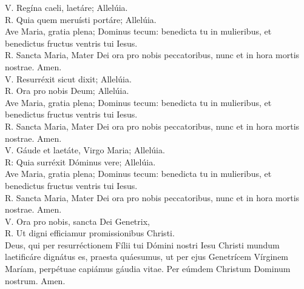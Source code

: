 \documentclass[letterpaper, landscape, 10pt, twocolumn]{article}
\begin{document}
  \noindent
  \normalsize
  {\color{red} V. R}egína caeli, laetáre; {\color{red} A}llelúia.\\
  {\color{red} R. Q}uia quem meruísti portáre; {\color{red} A}llelúia.\\

  \noindent
  {\color{red} A}ve Maria, gratia plena; Dominus tecum: benedicta tu in mulieribus, et benedictus fructus ventris tui Iesus.\\
  {\color{red} R. S}ancta Maria, Mater Dei ora pro nobis peccatoribus, nunc et in hora mortis nostrae. {\color{red} A}men.\\

  \noindent
  {\color{red} V. R}esurréxit sicut dixit; {\color{red} A}llelúia.\\
  {\color{red} R. O}ra pro nobis Deum; {\color{red} A}llelúia.\\

  \noindent
  {\color{red} A}ve Maria, gratia plena; Dominus tecum: benedicta tu in mulieribus, et benedictus fructus ventris tui Iesus.\\
  {\color{red} R. S}ancta Maria, Mater Dei ora pro nobis peccatoribus, nunc et in hora mortis nostrae. {\color{red} A}men.\\

  \noindent
  {\color{red} V. G}áude et laetáte, Virgo Maria; {\color{red} A}llelúia.\\
  {\color{red} R: Q}uia surréxit Dóminus vere; {\color{red} A}llelúia.\\

  \noindent
  {\color{red} A}ve Maria, gratia plena; Dominus tecum: benedicta tu in mulieribus, et benedictus fructus ventris tui Iesus.\\
  {\color{red} R. S}ancta Maria, Mater Dei ora pro nobis peccatoribus, nunc et in hora mortis nostrae. {\color{red} A}men.\\

  \noindent
  {\color{red} V. O}ra pro nobis, sancta Dei Genetrix,\\
  {\color{red} R. U}t digni efficiamur promissionibus Christi.\\

  \noindent
  {\color{red} D}eus, qui per resurréctionem Fílii tui Dómini nostri Iesu Christi mundum laetificáre dignátus es, praesta quáesumus, ut per ejus Genetrícem Vírginem Maríam, perpétuae capiámus gáudia vitae. Per eúmdem Christum Dominum nostrum. {\color{red} A}men.\\
  \clearpage
\end{document}

